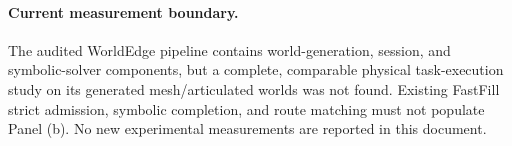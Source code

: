 \documentclass[10pt,a4paper]{article}
\begin{document}
\paragraph{Current measurement boundary.}
The audited WorldEdge pipeline contains world-generation, session, and symbolic-solver components, but a complete, comparable physical task-execution study on its generated mesh/articulated worlds was not found. Existing FastFill strict admission, symbolic completion, and route matching must not populate Panel (b). No new experimental measurements are reported in this document.
\end{document}
